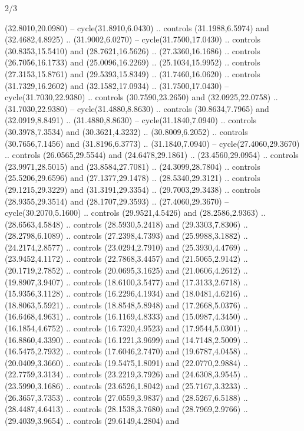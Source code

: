\begin{flagdescription}{2/3}
\begin{scope}[yshift=\flagwidth,scale=\flagwidth/1241.93737]
\begin{scope}[y=-1mm, x=1mm,draw=gold,fill=blue,line join=miter,miter limit=4,line width=1.8\lw]
\begin{scope}[y=1mm, x=1mm, yscale=-1,shift={(573.68mm+\str,145.75)}]
\begin{scope}[scale=1.35,shift={(-9,-3)}]
\begin{scope}[scale=0.55]
\begin{scope}[scale=1.333]
    (32.8010,20.0980) -- cycle(31.8910,6.0430) .. controls (31.1988,6.5974) and
    (32.4682,4.8925) .. (31.9002,6.0270) -- cycle(31.7500,17.0430) .. controls
    (30.8353,15.5410) and (28.7621,16.5626) .. (27.3360,16.1686) .. controls
    (26.7056,16.1733) and (25.0096,16.2269) .. (25.1034,15.9952) .. controls
    (27.3153,15.8761) and (29.5393,15.8349) .. (31.7460,16.0620) .. controls
    (31.7329,16.2602) and (32.1582,17.0934) .. (31.7500,17.0430) --
    cycle(31.7030,22.9380) .. controls (30.7590,23.2650) and (32.0925,22.0758) ..
    (31.7030,22.9380) -- cycle(31.4880,8.8630) .. controls (30.8634,7.7965) and
    (32.0919,8.8491) .. (31.4880,8.8630) -- cycle(31.1840,7.0940) .. controls
    (30.3978,7.3534) and (30.3621,4.3232) .. (30.8009,6.2052) .. controls
    (30.7656,7.1456) and (31.8196,6.3773) .. (31.1840,7.0940) --
    cycle(27.4060,29.3670) .. controls (26.0565,29.5544) and (24.6478,29.1861) ..
    (23.4560,29.0954) .. controls (23.9971,28.5015) and (23.8584,27.7081) ..
    (24.3099,28.7804) .. controls (25.5206,29.6596) and (27.1377,29.1478) ..
    (28.5340,29.3121) .. controls (29.1215,29.3229) and (31.3191,29.3354) ..
    (29.7003,29.3438) .. controls (28.9355,29.3514) and (28.1707,29.3593) ..
    (27.4060,29.3670) -- cycle(30.2070,5.1600) .. controls (29.9521,4.5426) and
    (28.2586,2.9363) .. (28.6563,4.5848) .. controls (28.5930,5.2418) and
    (29.3303,7.8306) .. (28.2798,6.1089) .. controls (27.2398,4.7393) and
    (25.9988,3.1882) .. (24.2174,2.8577) .. controls (23.0294,2.7910) and
    (25.3930,4.4769) .. (23.9452,4.1172) .. controls (22.7868,3.4457) and
    (21.5065,2.9142) .. (20.1719,2.7852) .. controls (20.0695,3.1625) and
    (21.0606,4.2612) .. (19.8907,3.9407) .. controls (18.6100,3.5477) and
    (17.3133,2.6718) .. (15.9356,3.1128) .. controls (16.2296,4.1934) and
    (18.0481,4.6216) .. (18.8063,5.5921) .. controls (18.8548,5.8948) and
    (17.2668,5.0376) .. (16.6468,4.9631) .. controls (16.1169,4.8333) and
    (15.0987,4.3450) .. (16.1854,4.6752) .. controls (16.7320,4.9523) and
    (17.9544,5.0301) .. (16.8860,4.3390) .. controls (16.1221,3.9699) and
    (14.7148,2.5009) .. (16.5475,2.7932) .. controls (17.6046,2.7470) and
    (19.6787,4.0458) .. (20.0409,3.3660) .. controls (19.5475,1.8091) and
    (22.0770,2.9884) .. (22.7759,3.3134) .. controls (23.2219,3.7926) and
    (24.6308,3.9545) .. (23.5990,3.1686) .. controls (23.6526,1.8042) and
    (25.7167,3.3233) .. (26.3657,3.7353) .. controls (27.0559,3.9837) and
    (28.5267,6.5188) .. (28.4487,4.6413) .. controls (28.1538,3.7680) and
    (28.7969,2.9766) .. (29.4039,3.9654) .. controls (29.6149,4.2804) and

\end{scope}
\end{scope}
\end{scope}
\end{scope}
\end{scope}
\end{scope}
\end{flagdescription}
